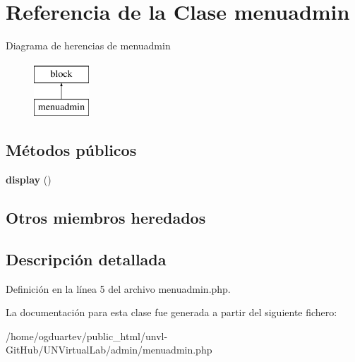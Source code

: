 \hypertarget{classmenuadmin}{}\section{Referencia de la Clase menuadmin}
\label{classmenuadmin}
Diagrama de herencias de menuadmin\begin{figure}[H]
\begin{center}
\leavevmode
\includegraphics[height=2.000000cm]{classmenuadmin}
\end{center}
\end{figure}
\subsection*{Métodos públicos}
\begin{DoxyCompactItemize}
\item 
\mbox{\label{classmenuadmin_a2df0d677d2ebbb3586176372ccd4b009}} 
{\bfseries display} ()
\end{DoxyCompactItemize}
\subsection*{Otros miembros heredados}


\subsection{Descripción detallada}


Definición en la línea 5 del archivo menuadmin.\+php.



La documentación para esta clase fue generada a partir del siguiente fichero\+:\begin{DoxyCompactItemize}
\item 
/home/ogduartev/public\+\_\+html/unvl-\/\+Git\+Hub/\+U\+N\+Virtual\+Lab/admin/menuadmin.\+php\end{DoxyCompactItemize}
